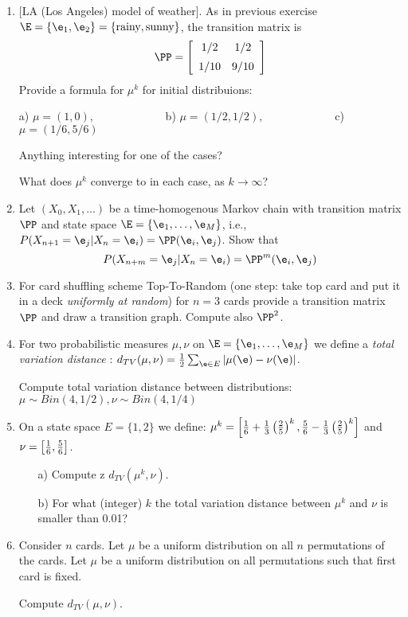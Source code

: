 \documentclass[a4paper,12pt]{article}
\begin{document}
\begin{enumerate}
\item\label{zad_LA}[LA (Los Angeles) model of weather]. As in previous exercise 
$\E=\{\e_1,\e_2\}=\{\textrm{rainy},\textrm{sunny}\}$, the transition matrix is
$$\PP=\left[
\begin{array}{cc}
     {1/2} & {1/ 2} \\[5pt]
{1/ 10} & {9/ 10}
    \end{array}\right]
$$
Provide a formula for $\mu^k$ for initial distribuions:
\par 
a) $\mu=(1,0), \qquad\qquad\qquad$ b) $\mu=(1/2,1/2), \qquad\qquad \qquad$ c) $\mu=(1/6, 5/6)$
\medskip\par 
Anything interesting for one of the cases?
\smallskip\par 
What does $\mu^k$ converge to in each case, as $k\to\infty$? 
 

\item
Let $(X_0, X_1,\ldots)$ be a time-homogenous Markov chain 
with transition matrix $\PP$ and state space
$\E=\{\e_1,\ldots,\e_M\}$, i.e., $P(X_{n+1}=\e_j | X_n=\e_i)=\PP(\e_i,\e_j)$.
Show that   $$P(X_{n+m}=\e_j | X_n=\e_i)=\PP^m(\e_i,\e_j)$$


\item For card shuffling scheme Top-To-Random  
(one step: take top card and put it in a deck \textsl{uniformly at random}) for $n=3$ cards 
provide a transition matrix $\PP$ and draw a transition graph. Compute also $\PP^2$.

\item For two probabilistic measures  $\mu,\nu$ on $\E=\{\e_1,\ldots,\e_M\}$ 
we define a  \textsl{total variation distance }: $d_{TV}(\mu,\nu)={1\over 2}\sum_{\e\in E} |\mu(\e)-\nu(\e)|$. \par 
Compute total variation distance between distributions:
$\mu\sim Bin(4,1/2), \nu\sim Bin(4,1/4)$

\item On a state space  $E=\{1,2\}$ we define: $\mu^k=\left[{1\over 6}+{1\over 3}\left({2\over 5}\right)^k,{5\over 6}-{1\over 3}\left({2\over 5}\right)^k\right]$ and  $\nu=\left[{1\over 6}, {5\over 6}\right]$.
\begin{itemize}
 \item[a)] Compute z $d_{TV}(\mu^k,\nu)$.
 \item[b)] For what (integer) $k$ the total variation distance between  $\mu^k$ and $\nu$ 
 is smaller than 0.01?
\end{itemize}

\item Consider $n$ cards. Let  $\mu$ be a uniform distribution 
on all $n$ permutations of the cards. Let $\mu$ be a uniform distribution 
on all permutations such that first card is fixed.\par 
Compute  $d_{TV}(\mu,\nu)$.
\end{enumerate}
 
\end{document}

